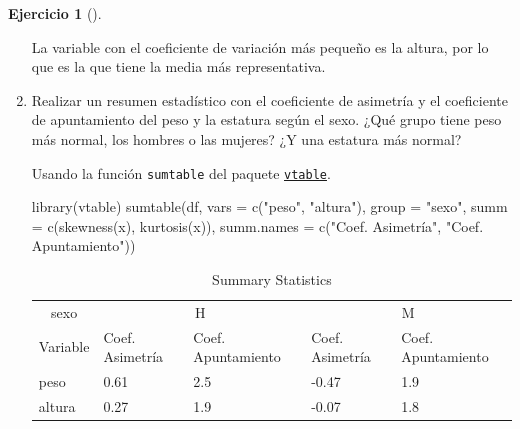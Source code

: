 \documentclass[
  a4paper,
]{scrreport}
\newenvironment{Shaded}{\begin{snugshade}}{\end{snugshade}}
\newcommand{\AttributeTok}[1]{\textcolor[rgb]{0.40,0.45,0.13}{#1}}
\newcommand{\FunctionTok}[1]{\textcolor[rgb]{0.28,0.35,0.67}{#1}}
\newcommand{\NormalTok}[1]{\textcolor[rgb]{0.00,0.23,0.31}{#1}}
\newcommand{\StringTok}[1]{\textcolor[rgb]{0.13,0.47,0.30}{#1}}
\theoremstyle{definition}
\newtheorem{exercise}{Ejercicio}[chapter]
\theoremstyle{remark}
\begin{document}
\begin{exercise}[]
\begin{enumerate}
\begin{tcolorbox}
  La variable con el coeficiente de variación más pequeño es la altura,
  por lo que es la que tiene la media más representativa.

  \end{tcolorbox}
\item
  Realizar un resumen estadístico con el coeficiente de asimetría y el
  coeficiente de apuntamiento del peso y la estatura según el sexo. ¿Qué
  grupo tiene peso más normal, los hombres o las mujeres? ¿Y una
  estatura más normal?

  \begin{tcolorbox}[enhanced jigsaw, coltitle=black, left=2mm, colback=white, leftrule=.75mm, toptitle=1mm, breakable, bottomrule=.15mm, titlerule=0mm, bottomtitle=1mm, title=\textcolor{quarto-callout-tip-color}{\faLightbulb}\hspace{0.5em}{Solución 1}, arc=.35mm, toprule=.15mm, rightrule=.15mm, colframe=quarto-callout-tip-color-frame, opacityback=0, colbacktitle=quarto-callout-tip-color!10!white, opacitybacktitle=0.6]

  Usando la función \texttt{sumtable} del paquete
  \href{https://cran.r-project.org/web/packages/vtable/vignettes/sumtable.html}{\texttt{vtable}}.

\begin{Shaded}
\begin{Highlighting}[]
\FunctionTok{library}\NormalTok{(vtable)}
\FunctionTok{sumtable}\NormalTok{(df, }\AttributeTok{vars =} \FunctionTok{c}\NormalTok{(}\StringTok{"peso"}\NormalTok{, }\StringTok{"altura"}\NormalTok{), }\AttributeTok{group =} \StringTok{"sexo"}\NormalTok{, }\AttributeTok{summ =} \FunctionTok{c}\NormalTok{(}\StringTok{\textquotesingle{}skewness(x)\textquotesingle{}}\NormalTok{, }\StringTok{\textquotesingle{}kurtosis(x)\textquotesingle{}}\NormalTok{),}
\AttributeTok{summ.names =} \FunctionTok{c}\NormalTok{(}\StringTok{"Coef. Asimetría"}\NormalTok{, }\StringTok{"Coef. Apuntamiento"}\NormalTok{))}
\end{Highlighting}
\end{Shaded}

  \begin{table}

  \caption{Summary Statistics}
  \centering
  \begin{tabular}[t]{lllll}
  \toprule
  \multicolumn{1}{c}{sexo} & \multicolumn{2}{c}{H} & \multicolumn{2}{c}{M} \\
  \cmidrule(l{3pt}r{3pt}){1-1} \cmidrule(l{3pt}r{3pt}){2-3} \cmidrule(l{3pt}r{3pt}){4-5}
  Variable & Coef. Asimetría & Coef. Apuntamiento & Coef. Asimetría & Coef. Apuntamiento\\
  \midrule
  peso & 0.61 & 2.5 & -0.47 & 1.9\\
  altura & 0.27 & 1.9 & -0.07 & 1.8\\
  \bottomrule
  \end{tabular}
  \end{table}


\end{tcolorbox}
\end{enumerate}
\end{exercise}
\end{document}
